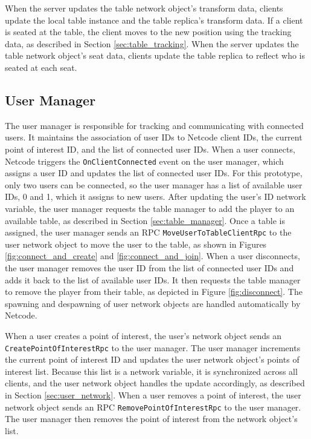         When the server updates the table network object's transform data, clients update the local table instance and the table replica's transform data. If a client is seated at the table, the client moves to the new position using the tracking data, as described in Section \ref{sec:table_tracking}. When the server updates the table network object's seat data, clients update the table replica to reflect who is seated at each seat.

    \subsection{User Manager} \label{sec:user_manager}
    
        The user manager is responsible for tracking and communicating with connected users. It maintains the association of user IDs to Netcode client IDs, the current point of interest ID, and the list of connected user IDs. When a user connects, Netcode triggers the \lstinline{OnClientConnected} event on the user manager, which assigns a user ID and updates the list of connected user IDs. For this prototype, only two users can be connected, so the user manager has a list of available user IDs, 0 and 1, which it assigns to new users. After updating the user's ID network variable, the user manager requests the table manager to add the player to an available table, as described in Section \ref{sec:table_manager}. Once a table is assigned, the user manager sends an RPC \lstinline{MoveUserToTableClientRpc} to the user network object to move the user to the table, as shown in Figures \ref{fig:connect_and_create} and \ref{fig:connect_and_join}. When a user disconnects, the user manager removes the user ID from the list of connected user IDs and adds it back to the list of available user IDs. It then requests the table manager to remove the player from their table, as depicted in Figure \ref{fig:disconnect}. The spawning and despawning of user network objects are handled automatically by Netcode.

        When a user creates a point of interest, the user's network object sends an \lstinline{CreatePointOf}\lstinline{InterestRpc} to the user manager. The user manager increments the current point of interest ID and updates the user network object's points of interest list. Because this list is a network variable, it is synchronized across all clients, and the user network object handles the update accordingly, as described in Section \ref{sec:user_network}. When a user removes a point of interest, the user network object sends an RPC \lstinline{RemovePointOfInterestRpc} to the user manager. The user manager then removes the point of interest from the network object's list.
        
